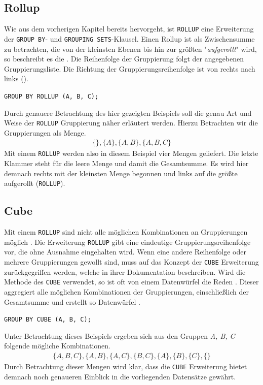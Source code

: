\subsection{Rollup}
\label{subsec:rollup} Wie aus dem vorherigen Kapitel bereits hervorgeht, ist \texttt{ROLLUP}
eine Erweiterung der \texttt{GROUP BY}- und \texttt{GROUPING SETS}-Klausel.
Einen Rollup ist als Zwischensumme zu betrachten, die von der kleinsten Ebenen bis
hin zur größten "\textit{aufgerollt}" wird, so beschreibt es die \citet{oracle99}.
Die Reihenfolge der Gruppierung folgt der angegebenen Gruppierungsliste. Die
Richtung der Gruppierungsreihenfolge ist von rechts nach links (\cite{oracle16}).

\texttt{GROUP BY ROLLUP (A, B, C);}

Durch genauere Betrachtung des hier gezeigten Beispiels soll die genau Art und
Weise der \texttt{ROLLUP} Gruppierung näher erläutert werden. Hierzu Betrachten
wir die Gruppierungen als Menge.
\begin{align*}
	\{ \}, \{A\}, \{A, B\}, \{A, B, C\}
\end{align*}
Mit einem \texttt{ROLLUP} werden also in diesem Beispiel vier Mengen geliefert. Die
letzte Klammer steht für die leere Menge und damit die Gesamtsumme. Es wird hier
demnach rechts mit der kleinsten Menge begonnen und links auf die größte
aufgerollt (\texttt{ROLLUP}).

\subsection{Cube}
\label{subsec:cube} Mit einem \texttt{ROLLUP} sind nicht alle möglichen
Kombinationen an Gruppierungen möglich \citep{oracle99}. Die Erweiterung \texttt{ROLLUP}
gibt eine eindeutige Gruppierungsreihenfolge vor, die ohne Ausnahme eingehalten
wird. Wenn eine andere Reihenfolge oder mehrere Gruppierungen gewollt sind, muss
auf das Konzept der \texttt{CUBE} Erweiterung zurückgegriffen werden, welche
\citet{oracle99} in ihrer Dokumentation beschreiben. Wird die Methode des
\texttt{CUBE} verwendet, so ist oft von einem Datenwürfel die Reden \citep{oracle99}.
Dieser aggregiert alle möglichen Kombinationen der Gruppierungen, einschließlich
der Gesamtsumme und erstellt so Datenwürfel \citep{oracle99}.

\texttt{GROUP BY CUBE (A, B, C);}

Unter Betrachtung dieses Beispiels ergeben sich aus den Gruppen \textit{A, B, C}
folgende mögliche Kombinationen.
\begin{align*}
	\{ A, B, C\}, \{A, B\}, \{A, C\}, \{B, C\}, \{A\}, \{B\}, \{C\}, \{ \}
\end{align*}
Durch Betrachtung dieser Mengen wird klar, dass die \texttt{CUBE} Erweiterung
bietet demnach noch genaueren Einblick in die vorliegenden Datensätze gewährt.
